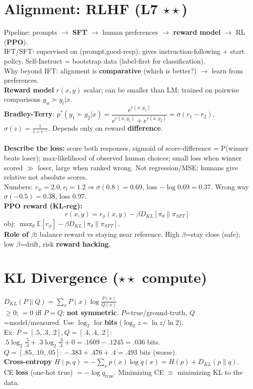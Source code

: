 \documentclass[12pt]{extarticle} %
\newcommand{\sub}[1]{\textcolor{key}{\textbf{#1}}}
\newcommand{\fb}[1]{\colorbox{yellow!30}{$#1$}} %
\newcommand{\fbw}[1]{\colorbox{yellow!30}{\resizebox{0.96\columnwidth}{!}{$#1$}}} %
\begin{document}
\begin{multicols}{3}
\section{Alignment: RLHF \textnormal{(L7 \(\star\star\))}}
Pipeline: prompts $\to$ \sub{SFT} $\to$ human preferences $\to$ \sub{reward model} $\to$ RL (\sub{PPO}).\\
IFT/SFT: supervised on (prompt,good-resp); gives instruction-following + start policy. Self-Instruct = bootstrap data (label-first for classification).\\
Why beyond IFT: alignment is \sub{comparative} (which is better?) $\to$ learn from preferences.\\
\sub{Reward model} $r(x,y)$ scalar; can be smaller than LM; trained on pairwise comparisons $y_w\!\succ\!y_l|x$.\\
\sub{Bradley-Terry}: $p^*(y_1\!\succ\!y_2|x)=\dfrac{e^{r(x,y_1)}}{e^{r(x,y_1)}+e^{r(x,y_2)}}=\sigma(r_1{-}r_2)$, \ $\sigma(z)=\tfrac1{1+e^{-z}}$. Depends only on reward \sub{difference}.\\
\fbw{L_R=-\mathbb E_{(x,y_w,y_l)}[\log\sigma(r(x,y_w)-r(x,y_l))]}\\
\sub{Describe the loss:} score both responses, sigmoid of score-difference = P(winner beats loser); max-likelihood of observed human choices; small loss when winner scored $\gg$ loser, large when ranked wrong. Not regression/MSE: humans give relative not absolute scores.\\
Numbers: $r_w{=}2.0,r_l{=}1.2\Rightarrow\sigma(0.8){=}0.69$, loss $-\log0.69{=}0.37$. Wrong way $\sigma(-0.5){=}0.38$, loss $0.97$.\\
\sub{PPO reward (KL-reg):} \[ r(x,y)=r_\phi(x,y)-\beta D_{KL}[\pi_\theta\|\pi_{SFT}] \]
obj: $\max_\theta \mathbb E[r_\phi]-\beta D_{KL}[\pi_\theta\|\pi_{SFT}]$.\\
\sub{Role of $\beta$:} balance reward vs staying near reference. High $\beta$=stay close (safe); low $\beta$=drift, risk \sub{reward hacking}.

\section{KL Divergence \textnormal{(\(\star\star\) compute)}}
\fb{D_{KL}(P\|Q)=\sum_x P(x)\log\tfrac{P(x)}{Q(x)}}\\
$\ge0$; $=0$ iff $P{=}Q$; \sub{not symmetric}. $P$=true/ground-truth, $Q$=model/measured. Use $\log_2$ for \sub{bits} ($\log_2 z=\ln z/\ln2$).\\
Ex: $P{=}[.5,.3,.2],Q{=}[.4,.4,.2]$:\\
$.5\log_2\tfrac{.5}{.4}+.3\log_2\tfrac{.3}{.4}+0=.1609-.1245=\mathbf{.036}$ bits.\\
$Q{=}[.85,.10,.05]$: $-.383+.476+.4=\mathbf{.493}$ bits (worse).\\
\sub{Cross-entropy} $H(p,q)=-\sum_x p(x)\log q(x)=H(p)+D_{KL}(p\|q)$. CE \sub{loss} (one-hot true) $=-\log q_{\text{true}}$. Minimizing CE $\equiv$ minimizing KL to the data.


\end{multicols}
\end{document}
